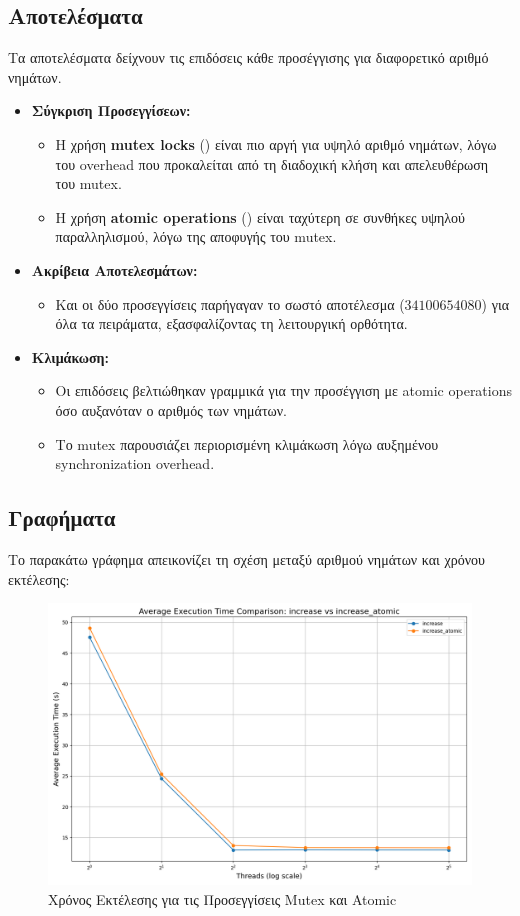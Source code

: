 \documentclass{article}
\begin{document}
\subsection*{Αποτελέσματα}
Τα αποτελέσματα δείχνουν τις επιδόσεις κάθε προσέγγισης για διαφορετικό αριθμό νημάτων.
\begin{itemize} 
    \item \textbf{Σύγκριση Προσεγγίσεων:} 
    \begin{itemize} 
        \item Η χρήση \textbf{mutex locks} () είναι πιο αργή για υψηλό αριθμό νημάτων, λόγω του overhead που προκαλείται από τη διαδοχική κλήση και απελευθέρωση του mutex. 
        \item Η χρήση \textbf{atomic operations} () είναι ταχύτερη σε συνθήκες υψηλού παραλληλισμού, λόγω της αποφυγής του mutex. 
    \end{itemize} 
    \item \textbf{Ακρίβεια Αποτελεσμάτων:} 
    \begin{itemize} 
        \item Και οι δύο προσεγγίσεις παρήγαγαν το σωστό αποτέλεσμα ($34100654080$) για όλα τα πειράματα, εξασφαλίζοντας τη λειτουργική ορθότητα. 
    \end{itemize} 
    \item \textbf{Κλιμάκωση:} 
    \begin{itemize} 
        \item Οι επιδόσεις βελτιώθηκαν γραμμικά για την προσέγγιση με atomic operations όσο αυξανόταν ο αριθμός των νημάτων. 
        \item Το mutex παρουσιάζει περιορισμένη κλιμάκωση λόγω αυξημένου synchronization overhead. 
    \end{itemize} 
\end{itemize}
\subsection*{Γραφήματα}
Το παρακάτω γράφημα απεικονίζει τη σχέση μεταξύ αριθμού νημάτων και χρόνου εκτέλεσης:
\newpage
\begin{figure}[h] 
    \centering 
    \includegraphics[width=1\textwidth]{increase_results.png} 
    \caption{Χρόνος Εκτέλεσης για τις Προσεγγίσεις Mutex και Atomic} 
\end{figure}
\end{document}
